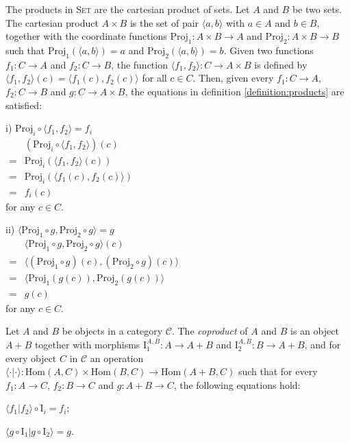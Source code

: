 The products in \textsc{Set} are the cartesian product of sets. Let $ A $ and $ B $ be two sets. The cartesian product $ A \times B $ is the set of pair $ \langle a, b \rangle $ with $ a \in A $ and $ b \in B $, together with the coordinate functions $ \text{Proj}_1 : A \times B \to A $ and $ \text{Proj}_2 : A \times B \to B $ such that $ \text{Proj}_1 ( \langle a, b \rangle ) = a $ and $ \text{Proj}_2 ( \langle a, b \rangle ) = b $. Given two functions $ f_1 : C \to A $ and $ f_2 : C \to B $, the function $ \langle f_1 , f_2 \rangle : C \to A \times B $ is defined by $ \langle f_1 , f_2 \rangle (c) = \langle f_1 (c) , f_2 (c) \rangle $ for all $ c \in C $. Then, given every $ f_1 : C \to A $, $ f_2 : C \to B $ and $ g : C \to A \times B $, the equations in definition \ref{definition:products} are satisfied:
\begin{myitemize}
\item[i)] $ \text{Proj}_i \circ \langle f_1 , f_2 \rangle = f_i $\\
$
\begin{array}{ll}
  & ( \text{Proj}_i \circ \langle f_1 , f_2 \rangle )(c)\\
= & \text{Proj}_i ( \langle f_1 , f_2 \rangle (c) )\\
= & \text{Proj}_i ( \langle f_1 (c) , f_2 (c) \rangle )\\
= & f_i (c)
\end{array}
$\\
for any $ c \in C $.
\item[ii)] $ \langle \text{Proj}_1 \circ g , \text{Proj}_2 \circ g \rangle = g $\\
$
\begin{array}{ll}
  & \langle \text{Proj}_1 \circ g , \text{Proj}_2 \circ g \rangle (c)\\
= & \langle ( \text{Proj}_1 \circ g )(c) , ( \text{Proj}_2 \circ g )(c) \rangle \\
= & \langle \text{Proj}_1 ( g(c) ) , \text{Proj}_2 ( g(c) ) \rangle \\
= & g(c)
\end{array}
$\\
for any $ c \in C $.
\end{myitemize}
\mbox\\

\begin{definition}
\label{definition:coproducts}
Let $ A $ and $ B $ be objects in a category $ \mathcal{C} $. The \emph{coproduct} of $ A $ and $ B $ is an object $ A+B $ together with morphisms $ \text{I}_1^{A,B} : A \to A + B $ and $ \text{I}_2^{A,B} : B \to A + B $, and for every object $ C $ in $ \mathcal{C} $ an operation $ \langle \cdot | \cdot \rangle : \text{Hom}(A,C) \times \text{Hom}(B,C) \to \text{Hom}(A+B,C) $ such that for every $ f_1 : A \to C $, $ f_2 : B \to C $ and $ g : A+B \to C $, the following equations hold:
\begin{myitemize}
\item $ \langle f_1 | f_2 \rangle \circ \text{I}_i = f_i $;
\item $ \langle g \circ \text{I}_1 | g \circ \text{I}_2 \rangle = g $.
\end{myitemize}
\end{definition}

